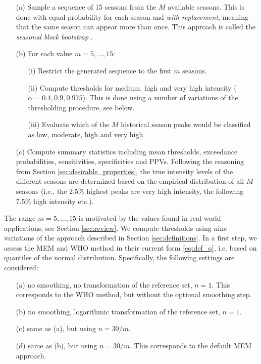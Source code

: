 \documentclass[12pt]{article}
\begin{document}
\begin{itemize}
\item[(a)] Sample a sequence of 15 seasons from the $M$ available seasons. This is done with equal probability for each season and \textit{with replacement}, meaning that the same season can appear more than once. This approach is called the \textit{seasonal block bootstrap} \citep{Politis2001}.
\item[(b)] For each value $m = 5, \dots, 15$:
\begin{itemize}
\item[(i)] Restrict the generated sequence to the first $m$ seasons.
\item[(ii)] Compute thresholds for medium, high and very high intensity ($\alpha = 0.4, 0.9, 0.975$). This is done using a number of variations of the thresholding procedure, see below.
\item[(iii)] Evaluate which of the $M$ historical season peaks would be classified as low, moderate, high and very high.
\end{itemize}
\item[(c)] Compute summary statistics including mean thresholds, exceedance probabilities, sensitivities, specificities and PPVs. Following the reasoning from Section \ref{sec:desirable_properties}, the true intensity levels of the different seasons are determined based on the empirical distribution of all $M$ seasons (i.e., the 2.5\% highest peaks are very high intensity, the following 7.5\% high intensity etc.).
\end{itemize}
The range $m =5, \dots, 15$ is motivated by the values found in real-world applications, see Section \ref{sec:review}. We compute thresholds using nine variations of the approach described in Section \ref{sec:definitions}. In a first step, we assess the MEM and WHO method in their current form \eqref{eq:def_q}, i.e. based on quantiles of the normal distribution. Specifically, the following settings are considered:
\begin{enumerate}
\item[(a)] no smoothing, no transformation of the reference set, $n = 1$. This corresponds to the WHO method, but without the optional smoothing step.
\item[(b)] no smoothing, logarithmic transformation of the reference set, $n = 1$.
\item[(c)] same as (a), but using $n = 30/m$.
\item[(d)] same as (b), but using $n = 30/m$. This corresponds to the default MEM approach.
\end{enumerate}
\end{document}
